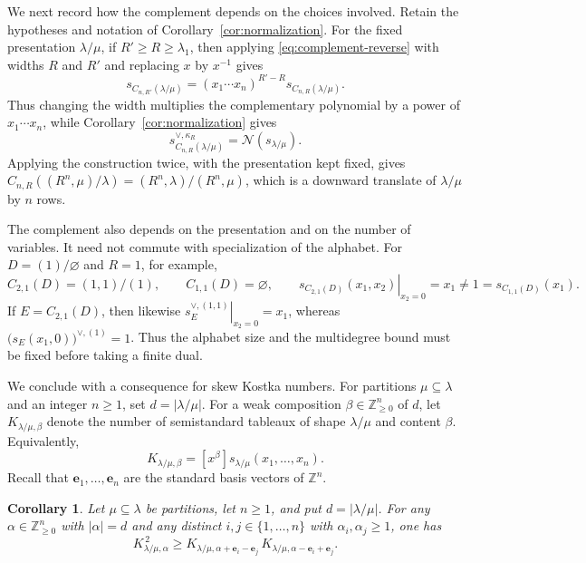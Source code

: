 \documentclass[11pt]{article}
\newtheorem{corollary}[theorem]{Corollary}
\theoremstyle{definition}
\newcommand{\Nop}{\mathcal N}
\newcommand{\Znonneg}{\mathbb Z_{\ge0}}
\begin{document}
We next record how the complement depends on the choices involved.  Retain
the hypotheses and notation of Corollary~\ref{cor:normalization}.  For the
fixed presentation $\lambda/\mu$, if $R'\ge R\ge\lambda_1$, then applying
\eqref{eq:complement-reverse} with widths $R$ and $R'$ and replacing $x$ by
$x^{-1}$ gives
\[
  s_{C_{n,R'}(\lambda/\mu)}
  =(x_1\cdots x_n)^{R'-R}s_{C_{n,R}(\lambda/\mu)}.
\]
Thus changing the width multiplies the complementary polynomial by a power
of $x_1\cdots x_n$, while Corollary~\ref{cor:normalization} gives
\[
  s_{C_{n,R}(\lambda/\mu)}^{\vee,\kappa_R}
  =\Nop(s_{\lambda/\mu}).
\]
Applying the construction twice, with the presentation kept fixed, gives
$C_{n,R}((R^n,\mu)/\lambda)=(R^n,\lambda)/(R^n,\mu)$, which is a downward
translate of $\lambda/\mu$ by $n$ rows.

The complement also depends on the presentation and on the number of
variables.  It need not commute with specialization of the alphabet.  For
$D=(1)/\varnothing$ and $R=1$, for example,
\[
  C_{2,1}(D)=(1,1)/(1),
  \qquad
  C_{1,1}(D)=\varnothing,
  \qquad
  \left.s_{C_{2,1}(D)}(x_1,x_2)\right|_{x_2=0}=x_1
  \ne 1=s_{C_{1,1}(D)}(x_1).
\]
If $E=C_{2,1}(D)$, then likewise
$\left.s_E^{\vee,(1,1)}\right|_{x_2=0}=x_1$, whereas
$\bigl(s_E(x_1,0)\bigr)^{\vee,(1)}=1$.  Thus the alphabet size and the
multidegree bound must be fixed before taking a finite dual.

We conclude with a consequence for skew Kostka numbers.  For partitions
$\mu\subseteq\lambda$ and an integer $n\ge1$, set
$d=|\lambda/\mu|$.  For a weak composition
$\beta\in\Znonneg^n$ of $d$, let $K_{\lambda/\mu,\beta}$ denote the number
of semistandard tableaux of shape $\lambda/\mu$ and content $\beta$.
Equivalently,
\[
  K_{\lambda/\mu,\beta}
  =[x^\beta]s_{\lambda/\mu}(x_1,\ldots,x_n).
\]
Recall that $\mathbf e_1,\ldots,\mathbf e_n$ are the standard basis vectors
of $\mathbb Z^n$.

\begin{corollary}\label{cor:skew-kostka}
Let $\mu\subseteq\lambda$ be partitions, let $n\ge1$, and put
$d=|\lambda/\mu|$.  For any $\alpha\in\Znonneg^n$ with $|\alpha|=d$
and any distinct $i,j\in\{1,\ldots,n\}$ with $\alpha_i,\alpha_j\ge1$, one has
\begin{equation}\label{eq:skew-kostka-logconcavity}
  K_{\lambda/\mu,\alpha}^{\,2}
  \ge
  K_{\lambda/\mu,\alpha+\mathbf e_i-\mathbf e_j}\,
  K_{\lambda/\mu,\alpha-\mathbf e_i+\mathbf e_j}.
\end{equation}
\end{corollary}
\end{document}
